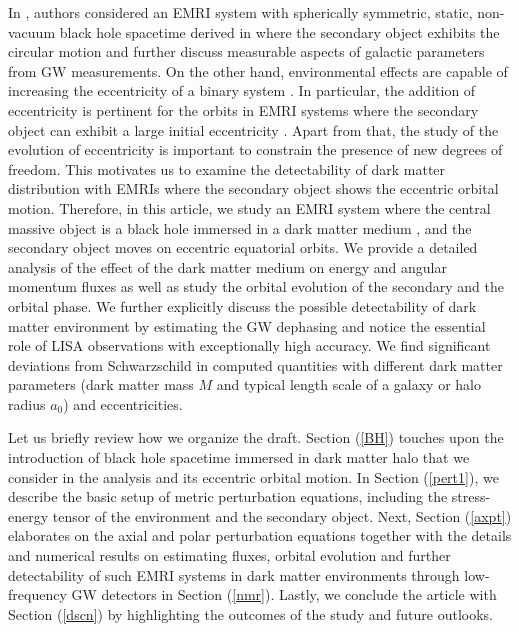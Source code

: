 \documentclass[11pt]{article}
\begin{document}
In \cite{Cardoso:2022whc}, authors considered an EMRI system with spherically symmetric, static, non-vacuum black hole spacetime derived in \cite{PhysRevD.105.L061501} where the secondary object exhibits the circular motion and further discuss measurable aspects of galactic parameters from GW measurements. On the other hand, environmental effects are capable of increasing the eccentricity of a binary system \cite{Cardoso:2020iji}. In particular, the addition of eccentricity is pertinent for the orbits in EMRI systems where the secondary object can exhibit a large initial eccentricity \cite{Barsanti:2022ana}. %
Apart from that, the study of the evolution of eccentricity is important to constrain the presence of new degrees of freedom. This motivates us to examine the detectability of dark matter distribution with EMRIs where the secondary object shows the eccentric orbital motion. Therefore, in this article, we study an EMRI system where the central massive object is a black hole immersed in a dark matter medium \cite{PhysRevD.105.L061501}, and the secondary object moves on eccentric equatorial orbits. We provide a detailed analysis of the effect of the dark matter medium on energy and angular momentum fluxes as well as study the orbital evolution of the secondary and the orbital phase. We further explicitly discuss the possible detectability of dark matter environment by estimating the GW dephasing and notice the essential role of LISA observations with exceptionally high accuracy. We find significant deviations from Schwarzschild in computed quantities with different dark matter parameters (dark matter mass $M$ and typical length scale of a galaxy or halo radius $a_{0}$) and eccentricities.  

Let us briefly review how we organize the draft. Section (\ref{BH}) touches upon the introduction of black hole spacetime immersed in dark matter halo that we consider in the analysis and its eccentric orbital motion. In Section (\ref{pert1}), we describe the basic setup of metric perturbation equations, including the stress-energy tensor of the environment and the secondary object. Next, Section (\ref{axpt}) elaborates on the axial and polar perturbation equations together with the details and numerical results on estimating fluxes, orbital evolution and further detectability of such EMRI systems in dark matter environments through low-frequency GW detectors in Section (\ref{nmr}). Lastly, we conclude the article with Section (\ref{dscn}) by highlighting the outcomes of the study and future outlooks. 
\end{document}
